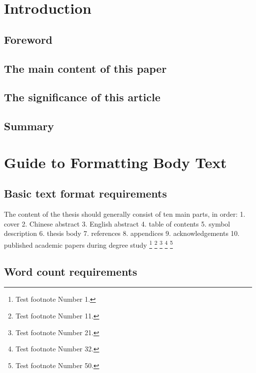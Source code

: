 \chapter{Introduction}

\section{Foreword}

\lipsum[1]

\section{The main content of this paper}

\lipsum[2]

\section{The significance of this article}

\lipsum[3]

\section{Summary}

\lipsum[4]


\chapter{Guide to Formatting Body Text}

\section{Basic text format requirements}

The content of the thesis should generally consist of ten main parts\cite{Jia2000}, in order:
1. cover
2. Chinese abstract
3. English abstract
4. table of contents
5. symbol description
6. thesis body
7. references
8. appendices
9. acknowledgements
10. published academic papers during degree study
\footnote[1]{Test footnote Number 1.}
\footnote[11]{Test footnote Number 11.}
\footnote[21]{Test footnote Number 21.}
\footnote[32]{Test footnote Number 32.}
\footnote[50]{Test footnote Number 50.}

\section{Word count requirements}

